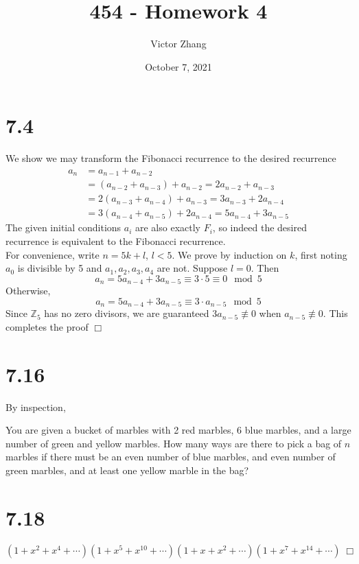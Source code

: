 \documentclass{article}
\title{454 - Homework 4}
\author{Victor Zhang}
\date{October 7, 2021}
\newenvironment{myindentpar}[1]
  {\begin{list}{}
          {
            \setlength{\leftmargin}{#1}
            \setlength{\rightmargin}{#1}
          }
          \item[]
  }
  {\end{list}}
\begin{document}
\maketitle

\section*{7.4}
We show we may transform the Fibonacci recurrence to the desired recurrence
\begin{equation*}
\begin{split}
a_n &= a_{n-1} + a_{n-2}\\
&= (a_{n-2} + a_{n-3}) + a_{n-2} = 2a_{n-2} + a_{n-3}\\
&= 2(a_{n-3} + a_{n-4}) + a_{n-3} = 3a_{n-3} + 2a_{n-4}\\
&= 3(a_{n-4} + a_{n-5}) + 2a_{n-4} = 5a_{n-4} + 3a_{n-5}
\end{split}
\end{equation*}
The given initial conditions $a_i$ are also exactly $F_i$, so indeed the desired recurrence is equivalent to the Fibonacci recurrence.\\
For convenience, write $n = 5k + l$, $l < 5$. We prove by induction on $k$, first noting $a_0$ is divisible by 5 and $a_1, a_2, a_3, a_4$ are not. Suppose $l = 0$. Then
$$a_n = 5a_{n-4} + 3a_{n-5} \equiv 3 \cdot 5 \equiv 0 \mod 5$$
Otherwise,
$$a_n = 5a_{n-4} + 3a_{n-5} \equiv 3 \cdot a_{n-5} \mod 5$$
Since $\mathbb{Z}_5$ has no zero divisors, we are guaranteed $3a_{n-5} \not\equiv 0$ when $a_{n-5} \not\equiv 0$. This completes the proof $\Box$

\section*{7.16}
By inspection,
\begin{myindentpar}{1em}
You are given a bucket of marbles with 2 red marbles, 6 blue marbles, and a large number of green and yellow marbles. How many ways are there to pick a bag of $n$ marbles if there must be an even number of blue marbles, and even number of green marbles, and at least one yellow marble in the bag?
\end{myindentpar}

\section*{7.18}
$$(1 + x^2 + x^4 + \cdots)(1 + x^5 + x^{10} + \cdots)(1 + x + x^2 + \cdots)(1 + x^7 + x^{14} + \cdots) \; \Box$$
\end{document}
